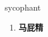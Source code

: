 
\begin{frame}
{\huge sycophant}
\begin{center}
\begin{enumerate}\Large
  \item \textbf{马屁精}
\end{enumerate}
\end{center}
\end{frame}
